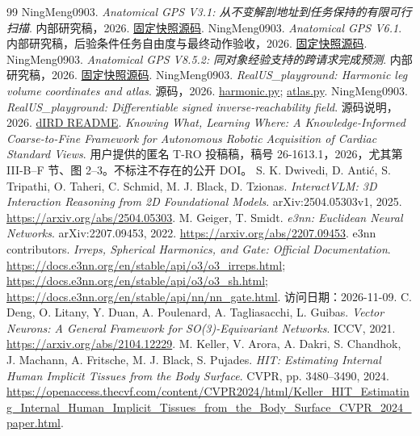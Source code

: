 \documentclass[UTF8,fontset=fandol,11pt,a4paper]{ctexart}
\theoremstyle{plain}
\theoremstyle{definition}
\theoremstyle{remark}
\numberwithin{equation}{section}
\newcommand{\Repo}{https://github.com/NingMeng0903/RealUS_playground/blob/66bd7f449b0ea8786beb714d7004ba13fbed82a3}
\begin{document}
\begin{thebibliography}{99}
 NingMeng0903. \emph{Anatomical GPS V3.1: 从不变解剖地址到任务保持的有限可行扫描}. 内部研究稿，2026.
\href{\Repo/NMI_idea/ideas/Anatomical_GPS_V3.1.tex}{固定快照源码}.
 NingMeng0903. \emph{Anatomical GPS V6.1}. 内部研究稿，后验条件任务自由度与最终动作验收，2026.
\href{\Repo/NMI_idea/ideas/Anatomical_GPS_V6.1.tex}{固定快照源码}.
 NingMeng0903. \emph{Anatomical GPS V8.5.2: 同对象经验支持的跨请求完成预测}. 内部研究稿，2026.
\href{\Repo/NMI_idea/ideas/Anatomical_GPS_V8.5.2.tex}{固定快照源码}.
 NingMeng0903. \emph{RealUS\_playground: Harmonic leg volume coordinates and atlas}. 源码，2026.
\href{\Repo/src/projects/genesis_ue_sync/anatomy_retarget/leg_volume_coordinates/harmonic.py}{harmonic.py};
\href{\Repo/src/projects/genesis_ue_sync/anatomy_retarget/leg_volume_coordinates/atlas.py}{atlas.py}.
 NingMeng0903. \emph{RealUS\_playground: Differentiable signed inverse-reachability field}. 源码说明，2026.
\href{\Repo/ird_playground/README.md}{dIRD README}.
 \emph{Knowing What, Learning Where: A Knowledge-Informed Coarse-to-Fine Framework for Autonomous Robotic Acquisition of Cardiac Standard Views}. 用户提供的匿名 T-RO 投稿稿，稿号 26-1613.1，2026，尤其第 III-B--F 节、图 2--3。不标注不存在的公开 DOI。
 S. K. Dwivedi, D. Anti\'{c}, S. Tripathi, O. Taheri, C. Schmid, M. J. Black, D. Tzionas.
\emph{InteractVLM: 3D Interaction Reasoning from 2D Foundational Models}. arXiv:2504.05303v1, 2025.
\url{https://arxiv.org/abs/2504.05303}.
 M. Geiger, T. Smidt. \emph{e3nn: Euclidean Neural Networks}. arXiv:2207.09453, 2022.
\url{https://arxiv.org/abs/2207.09453}.
 e3nn contributors. \emph{Irreps, Spherical Harmonics, and Gate: Official Documentation}.
\url{https://docs.e3nn.org/en/stable/api/o3/o3_irreps.html};
\url{https://docs.e3nn.org/en/stable/api/o3/o3_sh.html};
\url{https://docs.e3nn.org/en/stable/api/nn/nn_gate.html}. 访问日期：2026-11-09.
 C. Deng, O. Litany, Y. Duan, A. Poulenard, A. Tagliasacchi, L. Guibas.
\emph{Vector Neurons: A General Framework for SO(3)-Equivariant Networks}. ICCV, 2021.
\url{https://arxiv.org/abs/2104.12229}.
 M. Keller, V. Arora, A. Dakri, S. Chandhok, J. Machann, A. Fritsche, M. J. Black, S. Pujades.
\emph{HIT: Estimating Internal Human Implicit Tissues from the Body Surface}. CVPR, pp. 3480--3490, 2024.
\url{https://openaccess.thecvf.com/content/CVPR2024/html/Keller_HIT_Estimating_Internal_Human_Implicit_Tissues_from_the_Body_Surface_CVPR_2024_paper.html}.

\end{thebibliography}
\end{document}
